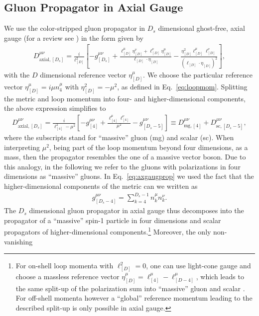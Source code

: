 \subsection{Gluon Propagator in Axial Gauge}
\label{sec:glue-axial}
We use the color-stripped gluon propagator in $D_s$ dimensional ghost-free,
axial gauge (for a review see \cite{Leibbrandt1987}) in the form given by
\begin{align}
  D^{\mu\nu}_{\text{axial},[D_s]} =
  \frac{i}{\ell_{[D]}^2}\left[-g^{\mu\nu}_{[D_s]} +
  \frac{\ell^\mu_{[D]}\eta^\nu_{[D]}+\ell^\nu_{[D]}\eta^\mu_{[D]}
}{\ell_{[D]}\cdot\eta_{[D]}} - \frac{\eta_{[D]}^2\ell^\mu_{[D]}\ell^\nu_{[D]}}{(\ell_{[D]}\cdot\eta_{[D]})^2}\right],
\end{align}
with the $D$ dimensional reference
vector $\eta_{[D]}^\mu$. We choose the particular reference vector $\eta_{[D]}^\mu =
i\mu n^\mu_4$ with $\eta_{[D]}^2=-\mu^2$, as defined in Eq.~\eqref{eq:loopmom}. Splitting the metric and loop momentum into
four- and higher-dimensional components, the above expression simplifies to
\begin{align}\label{eq:axgaugprop}
  D^{\mu\nu}_{\text{axial},[D_s]} =  \frac{i}{\ell_{[4]}^2-\mu^2}\left[-g^{\mu\nu}_{[4]}+
    \frac{\ell^\mu_{[4]}\ell^\nu_{[4]}}{\mu^2}-g^{\mu\nu}_{[D_s-5]}\right]  \equiv D^{\mu\nu}_{\text{mg},[4]} + D^{\mu\nu}_{\text{sc},[D_s-5]},
\end{align}
where the subscripts stand for ``massive'' gluon (mg) and scalar
(sc). When interpreting $\mu^2$, being part of the loop momentum beyond four dimensions, as a mass, then the propagator resembles the one of a massive vector boson. Due to this analogy, in the following we refer to the gluons with polarizations in four dimensions as ``massive'' gluons. In Eq.~\eqref{eq:axgaugprop} we used the fact that the higher-dimensional components of the metric can we
written as
\begin{align}
  g^{\mu\nu}_{[D_s-4]} = \sum_{k=4}^{D_s-1}n^\mu_kn_k^\nu.
\end{align}
The $D_s$ dimensional gluon propagator in axial gauge thus decomposes
into the propagator of a ``massive'' spin-1 particle in four dimensions
and scalar propagators of higher-dimensional components.\footnote{For on-shell
loop momenta with $\ell_{[D]}^2=0$, one can use light-cone gauge and choose a massless reference vector
$\eta_{[D]}^\mu = \ell^\mu_{[4]} - \ell^\mu_{[D-4]}$, which leads to
the same split-up of the polarization sum into ``massive'' gluon and
scalar \cite{Fazio:2014xea}. For off-shell momenta however a
``global'' reference momentum leading to the described split-up is
only possible in axial gauge.} Moreover, the only non-vanishing
